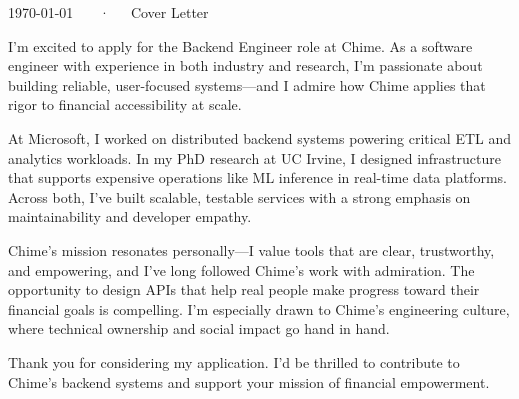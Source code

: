\documentclass[11pt, a4paper]{awesome-cv}
\begin{document}
\makecvheader[R]

\makecvfooter
  {\today}
  {\myname~~~·~~~Cover Letter}
  {}

\makelettertitle

\begin{cvletter}

I'm excited to apply for the Backend Engineer role at Chime. As a software engineer with experience in both industry and research, I’m passionate about building reliable, user-focused systems—and I admire how Chime applies that rigor to financial accessibility at scale.

At Microsoft, I worked on distributed backend systems powering critical ETL and analytics workloads. In my PhD research at UC Irvine, I designed infrastructure that supports expensive operations like ML inference in real-time data platforms. Across both, I’ve built scalable, testable services with a strong emphasis on maintainability and developer empathy.

Chime’s mission resonates personally—I value tools that are clear, trustworthy, and empowering, and I’ve long followed Chime’s work with admiration. The opportunity to design APIs that help real people make progress toward their financial goals is compelling. I’m especially drawn to Chime’s engineering culture, where technical ownership and social impact go hand in hand.

Thank you for considering my application. I’d be thrilled to contribute to Chime’s backend systems and support your mission of financial empowerment.

\end{cvletter}
\makeletterclosing
\end{document}
